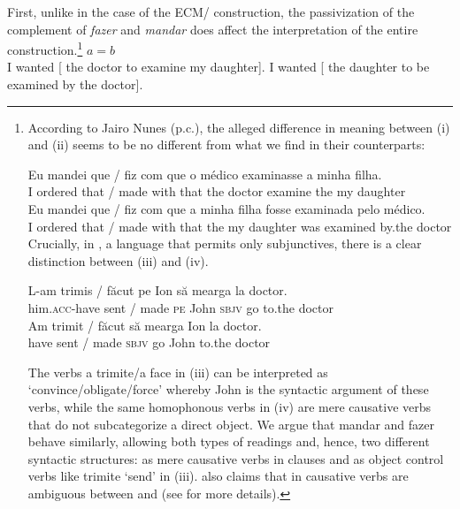 \documentclass[output=paper]{langsci/langscibook}
\begin{document}
First, unlike in the case of the ECM\slash {} construction, the passivization of the complement of \textit{fazer} and \textit{mandar} does affect the interpretation of the entire construction.\footnote{According to Jairo Nunes (p.c.), the alleged difference in meaning between (i) and (ii) seems to be no different from what we find in their  counterparts: 

\ea \gll Eu mandei que / fiz      com que o    médico examinasse a    minha filha.\\
	I    ordered that / made with that         the doctor  examine      the my      daughter\\
\z
\ea
\gll Eu  mandei  que / fiz      com que a    minha filha        fosse examinada pelo     médico.\\
	I     ordered  that / made with that         the my     daughter  was   examined   by.the doctor\\
\z
Crucially, in , a language that permits only subjunctives, there is a clear distinction between (iii) and (iv). 

\ea \gll L-am              trimis / făcut     pe Ion   să     mearga la       doctor.\\
         him.\textsc{acc}-have sent / made      \textsc{pe} John \textsc{sbjv} go         to.the doctor\\
\z
\ea \gll Am trimit / făcut să     mearga Ion  la       doctor.\\
         have sent / made \textsc{sbjv} go        John to.the doctor\\
\z

The verbs a trimite\slash a face in (iii) can be interpreted as ‘convince\slash obligate\slash force’ whereby John is the syntactic  argument of these verbs, while the same homophonous verbs in (iv) are mere causative verbs that do not subcategorize a direct object. We argue that mandar and fazer behave similarly, allowing both types of readings and, hence, two different syntactic structures: as mere causative verbs in  clauses and as object control verbs like trimite ‘send’ in (iii). \citet{Wurmbrand2001} also claims that in  causative verbs are ambiguous between  and  (see \citet{Wurmbrand2001} for more details).}
\newpage
\ea%
    $a = b$ \citep[119]{Farrell1995}\label{ex:moreno:9}\\
    \ea I wanted [ the doctor to examine my daughter].
    \ex I wanted [ the daughter to be examined by the doctor].
    \z
\z
\end{document}
